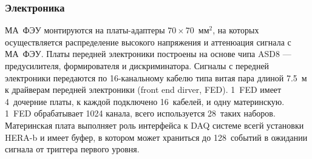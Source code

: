 \subsubsection{Электроника}

МА~ФЭУ монтируются на платы-адаптеры $70 \times 70$~мм$^2$, на которых осуществляется распределение высокого напряжения и аттенюация сигнала с МА~ФЭУ. Платы передней электроники построены на основе чипа ASD8 --- предусилителя, формирователя и дискриминатора. Сигналы с передней электроники передаются по 16-канальному кабелю типа витая пара длиной 7.5~м к драйверам передней электроники (front end dirver, FED). 1~FED имеет 4~дочерние платы, к каждой подключено 16~кабелей, и одну материнскую. 1~FED обрабатывает 1024 канала, всего используется 28~таких наборов. Материнская плата выполняет роль интерфейса к DAQ системе всегй установки HERA-b и имеет буфер, в котором может храниться до 128~событий в ожидании сигнала от триггера первого уровня.


